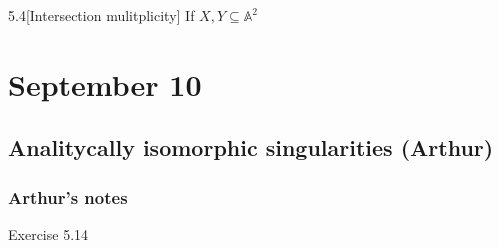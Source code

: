 \begin{manualexercise}{5.4}[Intersection mulitplicity]
	If $X,Y\subseteq \mathbb{A}^{2} $
\end{manualexercise}

\section{September 10}

\subsection{Analitycally isomorphic singularities (Arthur)}

\subsubsection{Arthur's notes}

\begin{thing5}{Exercise 5.14}\leavevmode
	
\end{thing5}

